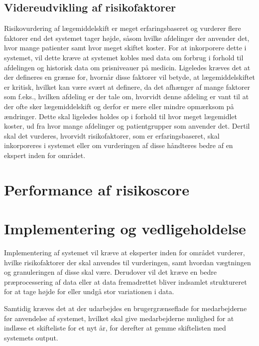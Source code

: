 \subsection{Videreudvikling af risikofaktorer}
Risikovurdering af lægemiddelskift er meget erfaringsbaseret og vurderer flere faktorer end det systemet tager højde, såsom hvilke afdelinger der anvender det, hvor mange patienter samt hvor meget skiftet koster. For at inkorporere dette i systemet, vil dette kræve at systemet kobles med data om forbrug i forhold til afdelingen og historisk data om prisniveauer på medicin. Ligeledes kræves det at der defineres en grænse for, hvornår disse faktorer vil betyde, at lægemiddelskiftet er kritisk, hvilket kan være svært at definere, da det afhænger af mange faktorer som f.eks., hvilken afdeling er der tale om, hvorvidt denne afdeling er vant til at der ofte sker lægemiddelskift og derfor er mere eller mindre opmærksom på ændringer. Dette skal ligeledes holdes op i forhold til hvor meget lægemidlet koster, ud fra hvor mange afdelinger og patientgrupper som anvender det. Dertil skal det vurderes, hvorvidt risikofaktorer, som er erfaringsbaseret, skal inkorporeres i systemet eller om vurderingen af disse håndteres bedre af en ekspert inden for området.

\section{Performance af risikoscore}


\section{Implementering og vedligeholdelse}
Implementering af systemet vil kræve at eksperter inden for området vurderer, hvilke risikofaktorer der skal anvendes til vurderingen, samt hvordan vægtningen og granuleringen  af disse skal være. Derudover vil det kræve en bedre præprocessering af data eller at data fremadrettet bliver indsamlet struktureret for at tage højde for eller undgå stor variationen i data.

Samtidig kræves det at der udarbejdes en brugergrænseflade for medarbejderne før anvendelse af systemet, hvilket skal give medarbejderne mulighed for at indlæse et skifteliste for et nyt år, for derefter at gemme skiftelisten med systemets output.

















